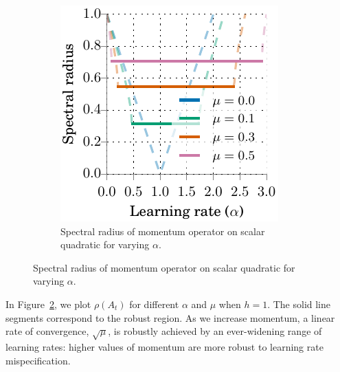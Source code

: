 \documentclass{article}
\newcommand{\mat}[1]{\bm{\mathit{#1}}}
\begin{document}
\begin{figure}
\vspace{-2.5em}
\begin{minipage}{1.0\linewidth}
\begin{figure}[H]
  \includegraphics[width=\linewidth]{figures/spectral_radii}
  \vspace{-1.5em}
\caption{
Spectral radius of momentum operator on scalar quadratic
for varying $\alpha$.
}
\label{fig:lr_robustness}
\end{figure}
\end{minipage}
\end{figure}
In Figure~\ref{fig:lr_robustness}, we plot $\rho(\mat{A}_t)$ for different $\alpha$ and $\mu$ when $h\!=\!1$.
The solid line segments correspond to the robust region.
As we increase momentum, a linear rate of convergence, $\sqrt{\mu}$, is robustly achieved by an ever-widening range of learning rates:
higher values of momentum are more robust to learning rate mispecification.
\end{document}

